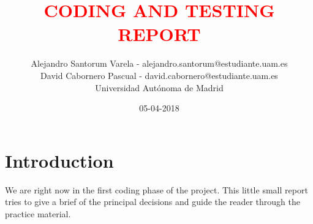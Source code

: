 \documentclass[12pt]{article}
\begin{document}
	\date{05-04-2018}
	
	
	\title{\textbf{\textcolor{red}{CODING AND TESTING REPORT}}}
	\author{Alejandro Santorum Varela - alejandro.santorum@estudiante.uam.es\\David Cabornero Pascual - david.cabornero@estudiante.uam.es\\Universidad Autónoma de Madrid}
	\maketitle
	
	\tableofcontents
	
	\newpage

\section{Introduction}
We are right now in the first coding phase of the project. This little small report tries to give a brief of the principal decisions and guide the reader through the practice material.\\
\end{document}
